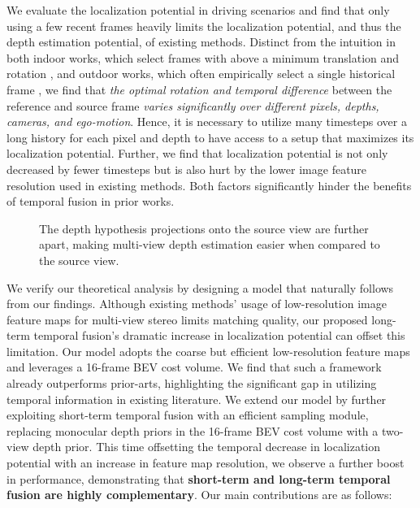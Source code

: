 \documentclass[runningheads, hyperfootnotes=false]{article}
\begin{document}
We evaluate the localization potential in driving scenarios and find that only using a few recent frames heavily limits the localization potential, and thus the depth estimation potential, of existing methods. Distinct from the intuition in both indoor works, which select frames with above a minimum translation and rotation \citep{Hou2019MultiViewSB,Sun2021NeuralReconRC}, and outdoor works, which often empirically select a single historical frame \citep{huang2022bevdet4d,wang2022monocular,liu2022petrv2}, we find that \textit{the optimal rotation and temporal difference} between the reference and source frame \textit{varies significantly over different pixels, depths, cameras, and ego-motion}. Hence, it is necessary to utilize many timesteps over a long history for each pixel and depth to have access to a setup that maximizes its localization potential. Further, we find that localization potential is not only decreased by fewer timesteps but is also hurt by the lower image feature resolution used in existing methods. Both factors significantly hinder the benefits of temporal fusion in prior works.
\begin{figure*}[t]
  \centering
  \captionsetup{aboveskip=0pt}\captionsetup{belowskip=0pt}\caption{The depth hypothesis projections onto the  source view are further apart, making multi-view depth estimation easier when compared to the  source view.}
  \label{fig:localization_potential}
\end{figure*} 
We verify our theoretical analysis by designing a model that naturally follows from our findings. Although existing methods' usage of low-resolution image feature maps for multi-view stereo limits matching quality, our proposed long-term temporal fusion's dramatic increase in localization potential can offset this limitation. Our model adopts the coarse but efficient low-resolution feature maps and leverages a 16-frame BEV cost volume. We find that such a framework already outperforms prior-arts, highlighting the significant gap in utilizing temporal information in existing literature. We extend our model by further exploiting short-term temporal fusion with an efficient sampling module, replacing monocular depth priors in the 16-frame BEV cost volume with a two-view depth prior. This time offsetting the temporal decrease in localization potential with an increase in feature map resolution, we observe a further boost in performance, demonstrating that \textbf{short-term and long-term temporal fusion are highly complementary}. Our main contributions are as follows:
\end{document}
